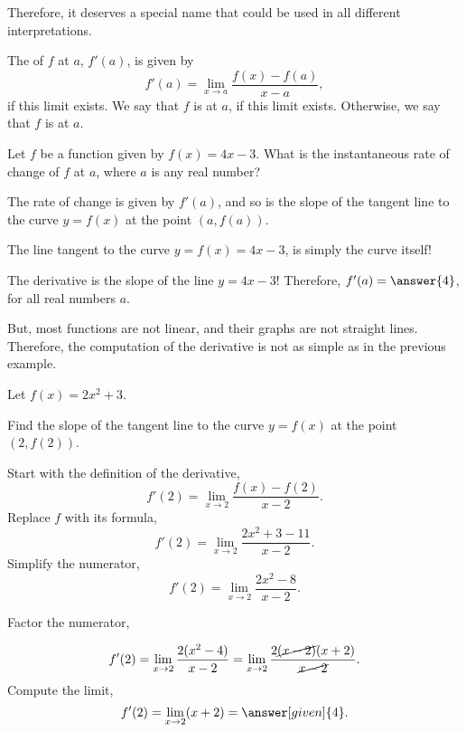 \documentclass{ximera}
\begin{document}
    Therefore, it deserves a special name that could be used in all different interpretations.
    \begin{definition}
  The  of $f$ at $a$, $f'(a)$, is given by
  \[
 f'(a) = \lim_{x\to a} \frac{f(x) - f(a)}{x-a},
  \]
  if this limit exists. We say that $f$ is 
  at $a$, if  this limit  exists. Otherwise,  we say that  $f$ is  at $a$.
\end{definition}

            \begin{question}
            Let $f$ be a function given by $f(x) = 4x-3$.
	What is the instantaneous rate of change of $f$ at $a$, where $a$ is any real number?
	\begin{hint}
		The rate of change is given by $f'(a)$, and so is the slope of the tangent line to the curve $y=f(x)$ at the point $(a,f(a))$.
	\end{hint}
	\begin{hint}
		The line tangent to the curve $y=f(x) = 4x-3$, is simply the curve itself!
	\end{hint}
	\begin{prompt}
		The derivative is the slope of the line $y= 4x-3$! Therefore,  $f'(a)=\answer{4}$, for all real numbers $a$.
	\end{prompt}
\end{question}


But, most functions are not linear, and  their graphs are not  straight lines.  Therefore, the computation of the derivative is not as simple as in the previous example.

\begin{example}
	Let $f(x) = 2x^2+3$.
	
	 Find the slope of the tangent line to the curve $y=f(x)$ at the point $(2,f(2))$.
			\begin{explanation}
		Start with the definition of the derivative,
		\[
 f'(2) = \lim_{x\to 2} \frac{f(x) - f(2)}{x-2}.
  \]
		Replace $f$ with its formula,
		\[
 f'(2) = \lim_{x\to 2} \frac{2x^2+3 - 11}{x-2}.
  \]
		Simplify the numerator,
				\[
 f'(2) = \lim_{x\to 2} \frac{2x^2-8}{x-2}.
  \]

		Factor the numerator,
			
				\[
 f'(2) = \lim_{x\to 2} \frac{2(x^2-4)}{x-2}=\lim_{x\to 2} \frac{2\cancel{(x-2)}(x+2)}{\cancel{x-2}}.
  \]
  Compute the limit,
			\[
 f'(2) =\lim_{x\to 2}(x+2)=\answer[given]{4}.
  \]

	\end{explanation}
	
\end{example}
\end{document}
